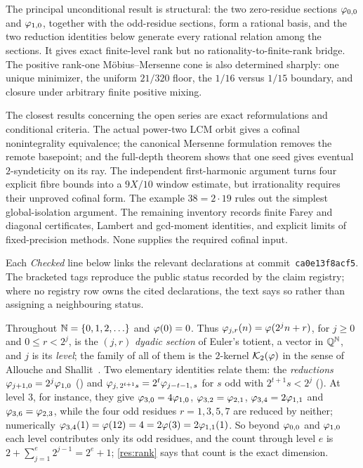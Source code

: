 \documentclass[11pt]{article}
\renewcommand{\commitshort}{ca0e13f8acf5}
\newcommand{\Ker}{\mathcal K}
\begin{document}
The principal unconditional result is structural: the two zero-residue
sections $\varphi_{0,0}$ and $\varphi_{1,0}$, together with the odd-residue sections,
form a rational basis, and the two reduction identities below generate every
rational relation among the sections.  It gives exact finite-level rank but
no rationality-to-finite-rank bridge.  The positive rank-one
M\"obius--Mersenne cone is also determined sharply: one unique minimizer,
the uniform $21/320$ floor, the $1/16$ versus $1/15$ boundary, and closure
under arbitrary finite positive mixing.

The closest results concerning the open series are exact reformulations and
conditional criteria.  The actual power-two LCM orbit gives a cofinal
nonintegrality equivalence; the canonical Mersenne formulation removes the
remote basepoint; and the full-depth theorem shows that one seed gives eventual
$2$-syndeticity on its ray.  The independent first-harmonic argument turns four
explicit fibre bounds into a $9X/10$ window estimate, but irrationality requires
their unproved cofinal form.  The example $38=2\cdot19$ rules out the simplest
global-isolation argument.  The remaining inventory records finite Farey and
diagonal certificates, Lambert and gcd-moment identities, and explicit limits
of fixed-precision methods.  None supplies the required cofinal input.

\statusboundary

Each \emph{Checked} line below links the relevant declarations at
commit~\texttt{\commitshort}.  The bracketed tags reproduce the public status
recorded by the claim registry; where no registry row owns the cited
declarations, the text says so rather than assigning a neighbouring status.

Throughout $\mathbb{N}=\{0,1,2,\ldots\}$ and $\varphi(0)=0$.  Thus
$\varphi_{j,r}(n)=\varphi(2^jn+r)$, for $j\ge0$ and $0\le r<2^j$, is the
$(j,r)$ \emph{dyadic section} of Euler's totient, a vector in $\mathbb{Q}^{\mathbb{N}}$, and
$j$ is its \emph{level}; the family of all of them is the $2$-kernel
$\Ker_2(\ph)$ in the sense of Allouche and Shallit~\cite{allouche-shallit}.
Two elementary identities relate them: the \emph{reductions}
$\varphi_{j+1,0}=2^{j}\varphi_{1,0}$
()
and $\varphi_{j,\,2^{t+1}s}=2^{t}\varphi_{j-t-1,\,s}$ for $s$ odd with $2^{t+1}s<2^j$
().
At level $3$, for instance, they give $\varphi_{3,0}=4\varphi_{1,0}$,
$\varphi_{3,2}=\varphi_{2,1}$, $\varphi_{3,4}=2\varphi_{1,1}$ and $\varphi_{3,6}=\varphi_{2,3}$, while
the four odd residues $r=1,3,5,7$ are reduced by neither; numerically
$\varphi_{3,4}(1)=\varphi(12)=4=2\varphi(3)=2\varphi_{1,1}(1)$.  So beyond $\varphi_{0,0}$ and
$\varphi_{1,0}$ each level contributes only its odd residues, and the count
through level $e$ is $2+\sum_{j=1}^{e}2^{j-1}=2^e+1$; \ref{res:rank} says that
count is the exact dimension.
\end{document}
